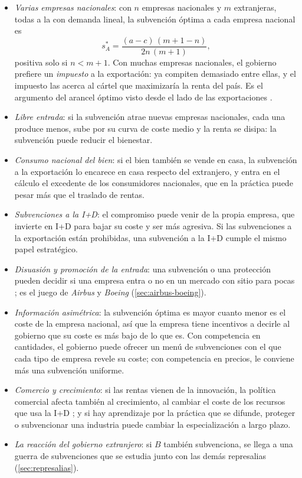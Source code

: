 \documentclass[11pt]{article}
\begin{document}
\begin{itemize}
\item \emph{Varias empresas nacionales}\nocite{Dixit1984International}: con $n$ empresas nacionales y $m$ extranjeras, todas a la  con demanda lineal, la subvención óptima a cada empresa nacional es
  $$s_A^*=\frac{(a-c)\,(m+1-n)}{2n\,(m+1)},$$
  positiva solo si $n<m+1$. Con muchas empresas nacionales, el gobierno prefiere un \emph{impuesto} a la exportación: ya compiten demasiado entre ellas, y el impuesto las acerca al cártel que maximizaría la renta del país. Es el argumento del arancel óptimo visto desde el lado de las exportaciones .
\item \emph{Libre entrada}\nocite{HorstmannMarkusen1986Up}: si la subvención atrae nuevas empresas nacionales, cada una produce menos, sube por su curva de coste medio y la renta se disipa: la subvención puede reducir el bienestar.
\item \emph{Consumo nacional del bien}: si el bien también se vende en casa, la subvención a la exportación lo encarece en casa respecto del extranjero, y entra en el cálculo el excedente de los consumidores nacionales, que en la práctica puede pesar más que el traslado de rentas\nocite{BaldwinKrugman1988Industrial}.
\item \emph{Subvenciones a la I+D}\nocite{SpencerBrander1983International}: el compromiso puede venir de la propia empresa, que invierte en I+D para bajar su coste y ser más agresiva. Si las subvenciones a la exportación están prohibidas, una subvención a la I+D cumple el mismo papel estratégico.
\item \emph{Disuasión y promoción de la entrada}\nocite{DixitKyle1985Use}: una subvención o una protección pueden decidir si una empresa entra o no en un mercado con sitio para pocas ; es el juego de \emph{Airbus} y \emph{Boeing} (\ref{sec:airbus-boeing}).
\item \emph{Información asimétrica}: la subvención óptima es mayor cuanto menor es el coste de la empresa nacional, así que la empresa tiene incentivos a decirle al gobierno que su coste es más bajo de lo que es. Con competencia en cantidades, el gobierno puede ofrecer un menú de subvenciones con el que cada tipo de empresa revele su coste; con competencia en precios, le conviene más una subvención uniforme\nocite{Brander1995Strategic}.
\item \emph{Comercio y crecimiento}: si las rentas vienen de la innovación, la política comercial afecta también al crecimiento, al cambiar el coste de los recursos que usa la I+D\nocite{GrossmanHelpman1991Innovation} ; y si hay aprendizaje por la práctica que se difunde, proteger o subvencionar una industria puede cambiar la especialización a largo plazo\nocite{Krugman1987Narrow}.
\item \emph{La reacción del gobierno extranjero}: si $B$ también subvenciona, se llega a una guerra de subvenciones que se estudia junto con las demás represalias (\ref{sec:represalias}).
\end{itemize}
\end{document}
